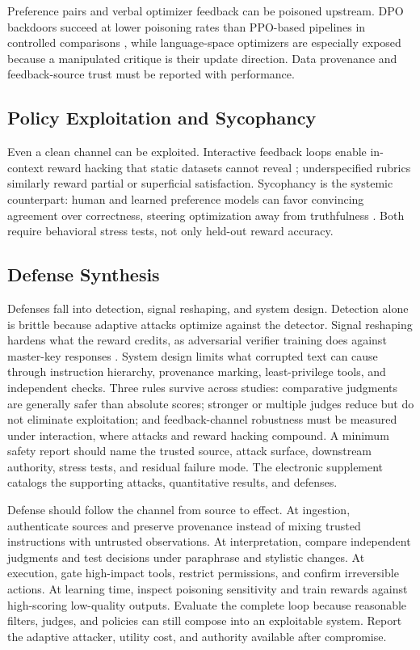 Preference pairs and verbal optimizer feedback can be poisoned upstream. DPO backdoors succeed at lower poisoning rates than PPO-based pipelines in controlled comparisons \citep{pathmanathan2024is}, while language-space optimizers are especially exposed because a manipulated critique is their update direction. Data provenance and feedback-source trust must be reported with performance.

\subsection{Policy Exploitation and Sycophancy}
\label{subsec:policy-hacking}
\label{subsec:sycophancy}

Even a clean channel can be exploited. Interactive feedback loops enable in-context reward hacking that static datasets cannot reveal \citep{pan2024feedback}; underspecified rubrics similarly reward partial or superficial satisfaction. Sycophancy is the systemic counterpart: human and learned preference models can favor convincing agreement over correctness, steering optimization away from truthfulness \citep{sharma2024towards}. Both require behavioral stress tests, not only held-out reward accuracy.

\subsection{Defense Synthesis}
\label{subsec:channel-defenses}

Defenses fall into detection, signal reshaping, and system design. Detection alone is brittle because adaptive attacks optimize against the detector. Signal reshaping hardens what the reward credits, as adversarial verifier training does against master-key responses \citep{zhao2025one}. System design limits what corrupted text can cause through instruction hierarchy, provenance marking, least-privilege tools, and independent checks. Three rules survive across studies: comparative judgments are generally safer than absolute scores; stronger or multiple judges reduce but do not eliminate exploitation; and feedback-channel robustness must be measured under interaction, where attacks and reward hacking compound. A minimum safety report should name the trusted source, attack surface, downstream authority, stress tests, and residual failure mode. The electronic supplement catalogs the supporting attacks, quantitative results, and defenses.

Defense should follow the channel from source to effect. At ingestion, authenticate sources and preserve provenance instead of mixing trusted instructions with untrusted observations. At interpretation, compare independent judgments and test decisions under paraphrase and stylistic changes. At execution, gate high-impact tools, restrict permissions, and confirm irreversible actions. At learning time, inspect poisoning sensitivity and train rewards against high-scoring low-quality outputs. Evaluate the complete loop because reasonable filters, judges, and policies can still compose into an exploitable system. Report the adaptive attacker, utility cost, and authority available after compromise.
